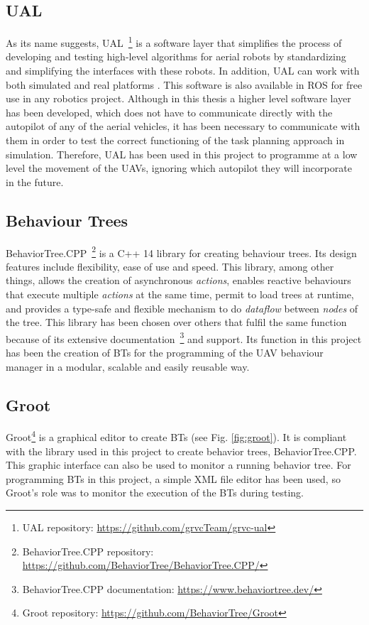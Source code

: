 \subsection{UAL}
\label{subsec:UAL}
As its name suggests, \gls{UAL}~\footnote{UAL repository: \url{https://github.com/grvcTeam/grvc-ual}} is a software layer that simplifies the process of developing and testing high-level algorithms for aerial robots by standardizing and simplifying the interfaces with these robots. In addition, \gls{UAL} can work with both simulated and real platforms \cite{real_ijars20}. This software is also available in \gls{ROS} for free use in any robotics project. Although in this thesis a higher level software layer has been developed, which does not have to communicate directly with the autopilot of any of the aerial vehicles, it has been necessary to communicate with them in order to test the correct functioning of the task planning approach in simulation. Therefore, \gls{UAL} has been used in this project to programme at a low level the movement of the \glspl{UAV}, ignoring which autopilot they will incorporate in the future.

\subsection{Behaviour Trees}
\label{subsec:BehaviourTrees}
BehaviorTree.CPP~\footnote{BehaviorTree.CPP repository: \url{https://github.com/BehaviorTree/BehaviorTree.CPP/}} is a C++ 14 library for creating behaviour trees. Its design features include flexibility, ease of use and speed. This library, among other things, allows the creation of asynchronous \emph{actions}, enables reactive behaviours that execute multiple \emph{actions} at the same time, permit to load trees at runtime, and provides a type-safe and flexible mechanism to do \emph{dataflow} between \emph{nodes} of the tree. This library has been chosen over others that fulfil the same function because of its extensive documentation~\footnote{BehaviorTree.CPP documentation: \url{https://www.behaviortree.dev/}} and support. Its function in this project has been the creation of \glspl{BT} for the programming of the \gls{UAV} behaviour manager in a modular, scalable and easily reusable way.

\subsection{Groot}
\label{subsec:Groot}
Groot\footnote{Groot repository: \url{https://github.com/BehaviorTree/Groot}} is a graphical editor to create \glspl{BT} (see Fig. \ref{fig:groot}). It is compliant with the library used in this project to create behavior trees, BehaviorTree.CPP. This graphic interface can also be used to monitor a running behavior tree. For programming \glspl{BT} in this project, a simple XML file editor has been used, so Groot's role was to monitor the execution of the \glspl{BT} during testing.

